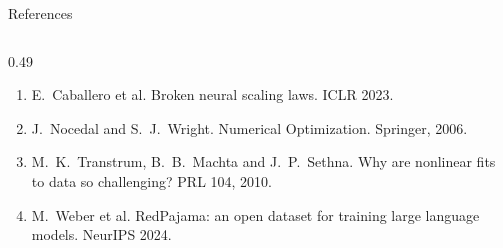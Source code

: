 \documentclass[aspectratio=169,11pt]{beamer}
\begin{document}
\begin{frame}{References}
\begin{columns}[T]
\begin{column}{0.49\textwidth}
\begin{enumerate}
        \item[{[12]}] E.~Caballero et al. Broken neural scaling laws. ICLR 2023.
        \item[{[13]}] J.~Nocedal and S.~J.~Wright. Numerical Optimization. Springer, 2006.
        \item[{[14]}] M.~K.~Transtrum, B.~B.~Machta and J.~P.~Sethna. Why are nonlinear fits to data so challenging? PRL 104, 2010.
        \item[{[15]}] M.~Weber et al. RedPajama: an open dataset for training large language models. NeurIPS 2024.
      \end{enumerate}
    \end{column}
  \end{columns}
\end{frame}
\end{document}
